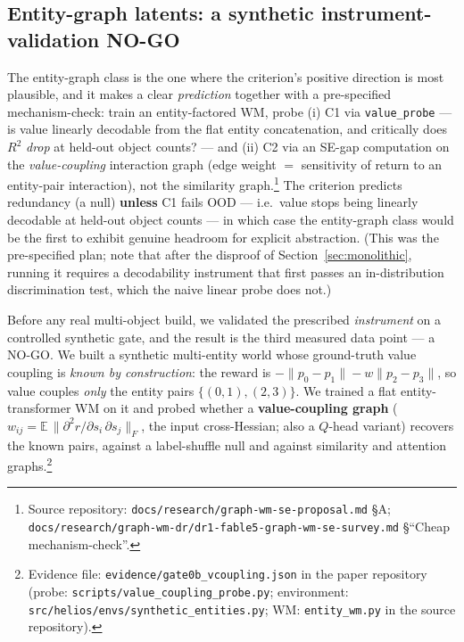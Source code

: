 \documentclass{article}
\begin{document}
\subsection{Entity-graph latents: a synthetic instrument-validation NO-GO}
\label{sec:entitygraph}

The entity-graph class is the one where the criterion's positive direction is most plausible, and it makes a clear \emph{prediction} together with a pre-specified mechanism-check: train an entity-factored WM, probe (i) C1 via \texttt{value\_probe} --- is value linearly decodable from the flat entity concatenation, and critically does $R^2$ \emph{drop} at held-out object counts? --- and (ii) C2 via an SE-gap computation on the \emph{value-coupling} interaction graph (edge weight $=$ sensitivity of return to an entity-pair interaction), not the similarity graph.\footnote{Source repository: \texttt{docs/research/graph-wm-se-proposal.md} \S A; \texttt{docs/research/graph-wm-dr/dr1-fable5-graph-wm-se-survey.md} \S``Cheap mechanism-check''.} The criterion predicts redundancy (a null) \textbf{unless} C1 fails OOD --- i.e.\ value stops being linearly decodable at held-out object counts --- in which case the entity-graph class would be the first to exhibit genuine headroom for explicit abstraction. (This was the pre-specified plan; note that after the disproof of Section~\ref{sec:monolithic}, running it requires a decodability instrument that first passes an in-distribution discrimination test, which the naive linear probe does not.)

Before any real multi-object build, we validated the prescribed \emph{instrument} on a controlled synthetic gate, and the result is the third measured data point --- a NO-GO. We built a synthetic multi-entity world whose ground-truth value coupling is \emph{known by construction}: the reward is $-\lVert p_0 - p_1 \rVert - w \lVert p_2 - p_3 \rVert$, so value couples \emph{only} the entity pairs $\{(0,1), (2,3)\}$. We trained a flat entity-transformer WM on it and probed whether a \textbf{value-coupling graph} ($w_{ij} = \mathbb{E}\,\lVert \partial^2 r / \partial s_i\, \partial s_j \rVert_F$, the input cross-Hessian; also a $Q$-head variant) recovers the known pairs, against a label-shuffle null and against similarity and attention graphs.\footnote{Evidence file: \texttt{evidence/gate0b\_vcoupling.json} in the paper repository (probe: \texttt{scripts/value\_coupling\_probe.py}; environment: \texttt{src/helios/envs/synthetic\_entities.py}; WM: \texttt{entity\_wm.py} in the source repository).}
\end{document}
